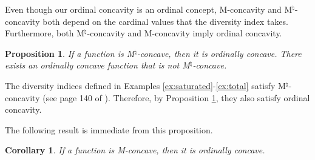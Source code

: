 \documentclass[12pt]{amsart}
\newtheorem{corollary}{Corollary}
\newtheorem{proposition}{Proposition}
\theoremstyle{remark}
\begin{document}
Even though our ordinal concavity is an ordinal concept,
M-concavity and M$^{\natural}$-concavity both depend on the cardinal
values that the diversity index takes. Furthermore, both M$^{\natural}$-concavity
and M-concavity imply ordinal concavity.

\begin{proposition}\label{prop:comparison}
If a function is M$^{\natural}$-concave, then it is ordinally concave. There exists
an ordinally concave function that is not M$^{\natural}$-concave.
\end{proposition}

The diversity indices defined in Examples \ref{ex:saturated}-\ref{ex:total}
satisfy M$^{\natural}$-concavity (see page 140 of \cite{Murota:SIAM:2003}).
Therefore, by Proposition \ref{prop:comparison}, they also satisfy
ordinal concavity.

The following result is immediate from this proposition.

\begin{corollary}
If a function is M-concave, then it is ordinally concave.
\end{corollary}

\begin{comment}
Now we provide an equivalent definition of ordinal concavity.

\begin{proposition}\label{prop:equal}
A function $f$ is ordinally concave if, and only if, the following holds:
For every distributions $\xi,\tilde{\xi}$ with
$(c,t) \in \calc \times \calt$ such that  $\xi_c^t>\tilde{\xi}_c^t$, either
\begin{enumerate}[(i)]
\item $f(\xi) \geq f(\xi-\chi_{c,t})$ implies $f(\tilde{\xi}+\chi_{c,t}) \geq f(\tilde{\xi})$, and
\item $f(\tilde{\xi})\geq f(\tilde{\xi}+\chi_{c,t})$ implies $f(\xi-\chi_{c,t}) \geq f(\xi)$, or
\end{enumerate}

there exists $(c',t')\in \calc \times \calt$ with
$\xi_{c'}^{t'}<\tilde{\xi}_{c'}^{t'}$ such that
\begin{enumerate}[(i)]
\item[(iii)] $f(\xi) \geq f(\xi-\chi_{c,t}+\chi_{c',t'})$ implies $f(\tilde{\xi}+\chi_{c,t}-\chi_{c',t'}) \geq f(\tilde{\xi})$, and
\item[(iv)] $f(\tilde{\xi})\geq f(\tilde{\xi}+\chi_{c,t}-\chi_{c',t'})$ implies $f(\xi-\chi_{c,t}+\chi_{c',t'}) \geq f(\xi)$.
\end{enumerate}
\end{proposition}

\begin{proof}[Proof of Proposition \ref{prop:equal}]
\end{proof}
\end{comment}
\end{document}
